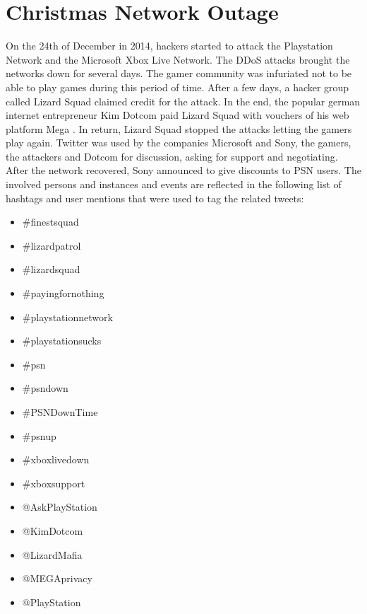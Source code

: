 \section{Christmas Network Outage}
\label{sec:christmas-network-outage}
On the 24th of December in 2014, hackers started to attack the Playstation Network and the Microsoft Xbox Live Network. The DDoS attacks brought the networks down for several days. The gamer community was infuriated not to be able to play games during this period of time.\cite{wool2014sony}
After a few days, a hacker group called Lizard Squad claimed credit for the attack.
In the end, the popular german internet entrepreneur Kim Dotcom paid Lizard Squad with vouchers of his web platform Mega \cite{Dotcom2014}. In return, Lizard Squad stopped the attacks letting the gamers play again. Twitter was used by the companies Microsoft and Sony, the gamers, the attackers and Dotcom for discussion, asking for support and negotiating. After the network recovered, Sony announced to give discounts to PSN users. The involved persons and instances and events are reflected in the following list of hashtags and user mentions that were used to tag the related tweets:

\begin{multicols}{3}
\begin{itemize}[label={}]
	\item \#finestsquad
	\item \#lizardpatrol
    \item \#lizardsquad
    \item \#payingfornothing
    \item \#playstationnetwork
    \item \#playstationsucks
    \item \#psn
    \item \#psndown
    \item \#PSNDownTime
    \item \#psnup
    \item \#xboxlivedown
    \item \#xboxsupport
    \item @AskPlayStation
    \item @KimDotcom
    \item @LizardMafia
    \item @MEGAprivacy
    \item @PlayStation
\end{itemize}
  \fixspacing
\end{multicols}

